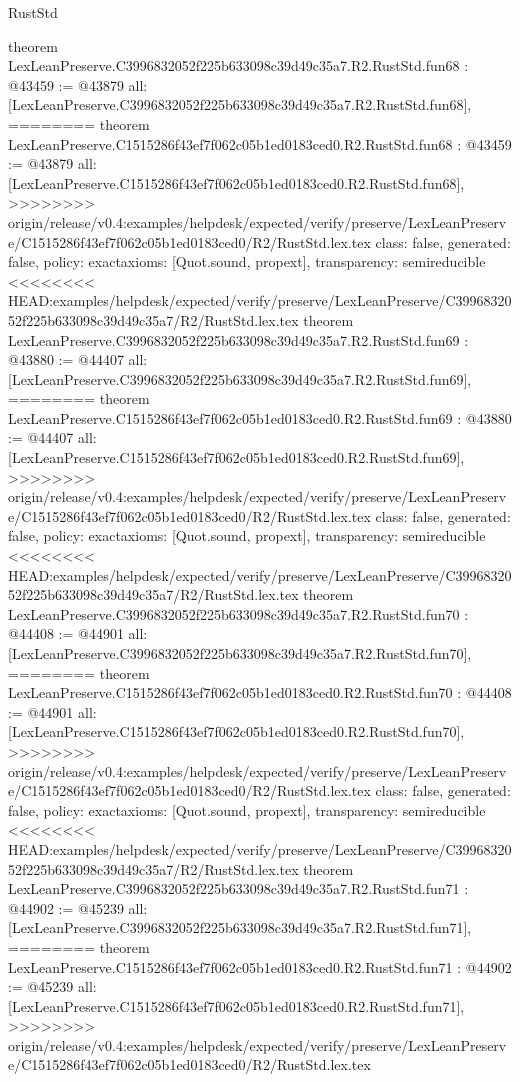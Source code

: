 \begin{lexlean}{RustStd}
\begin{coremodule}
{\begin{coremodule}
{{{{{{{{{{{{{{{{{{{{{{{{{{{{{{{{{{{{{{{{{{{{{{{{{{{{{{{{{{{{{{{{{{{{{{theorem LexLeanPreserve.C3996832052f225b633098c39d49c35a7.R2.RustStd.fun68 : @43459 := @43879 {
  all: [LexLeanPreserve.C3996832052f225b633098c39d49c35a7.R2.RustStd.fun68],
========
theorem LexLeanPreserve.C1515286f43ef7f062c05b1ed0183ced0.R2.RustStd.fun68 : @43459 := @43879 {
  all: [LexLeanPreserve.C1515286f43ef7f062c05b1ed0183ced0.R2.RustStd.fun68],
>>>>>>>> origin/release/v0.4:examples/helpdesk/expected/verify/preserve/LexLeanPreserve/C1515286f43ef7f062c05b1ed0183ced0/R2/RustStd.lex.tex
  class: false,
  generated: false,
  policy: exact{axioms: [Quot.sound, propext]},
  transparency: semireducible
}
<<<<<<<< HEAD:examples/helpdesk/expected/verify/preserve/LexLeanPreserve/C3996832052f225b633098c39d49c35a7/R2/RustStd.lex.tex
theorem LexLeanPreserve.C3996832052f225b633098c39d49c35a7.R2.RustStd.fun69 : @43880 := @44407 {
  all: [LexLeanPreserve.C3996832052f225b633098c39d49c35a7.R2.RustStd.fun69],
========
theorem LexLeanPreserve.C1515286f43ef7f062c05b1ed0183ced0.R2.RustStd.fun69 : @43880 := @44407 {
  all: [LexLeanPreserve.C1515286f43ef7f062c05b1ed0183ced0.R2.RustStd.fun69],
>>>>>>>> origin/release/v0.4:examples/helpdesk/expected/verify/preserve/LexLeanPreserve/C1515286f43ef7f062c05b1ed0183ced0/R2/RustStd.lex.tex
  class: false,
  generated: false,
  policy: exact{axioms: [Quot.sound, propext]},
  transparency: semireducible
}
<<<<<<<< HEAD:examples/helpdesk/expected/verify/preserve/LexLeanPreserve/C3996832052f225b633098c39d49c35a7/R2/RustStd.lex.tex
theorem LexLeanPreserve.C3996832052f225b633098c39d49c35a7.R2.RustStd.fun70 : @44408 := @44901 {
  all: [LexLeanPreserve.C3996832052f225b633098c39d49c35a7.R2.RustStd.fun70],
========
theorem LexLeanPreserve.C1515286f43ef7f062c05b1ed0183ced0.R2.RustStd.fun70 : @44408 := @44901 {
  all: [LexLeanPreserve.C1515286f43ef7f062c05b1ed0183ced0.R2.RustStd.fun70],
>>>>>>>> origin/release/v0.4:examples/helpdesk/expected/verify/preserve/LexLeanPreserve/C1515286f43ef7f062c05b1ed0183ced0/R2/RustStd.lex.tex
  class: false,
  generated: false,
  policy: exact{axioms: [Quot.sound, propext]},
  transparency: semireducible
}
<<<<<<<< HEAD:examples/helpdesk/expected/verify/preserve/LexLeanPreserve/C3996832052f225b633098c39d49c35a7/R2/RustStd.lex.tex
theorem LexLeanPreserve.C3996832052f225b633098c39d49c35a7.R2.RustStd.fun71 : @44902 := @45239 {
  all: [LexLeanPreserve.C3996832052f225b633098c39d49c35a7.R2.RustStd.fun71],
========
theorem LexLeanPreserve.C1515286f43ef7f062c05b1ed0183ced0.R2.RustStd.fun71 : @44902 := @45239 {
  all: [LexLeanPreserve.C1515286f43ef7f062c05b1ed0183ced0.R2.RustStd.fun71],
>>>>>>>> origin/release/v0.4:examples/helpdesk/expected/verify/preserve/LexLeanPreserve/C1515286f43ef7f062c05b1ed0183ced0/R2/RustStd.lex.tex
}}}}}}}}}}}}}}}}}}}}}}}}}}}}}}}}}}}}}}}}}}}}}}}}}}}}}}}}}}}}}}}}}}}}}}}}}}}
\end{coremodule}}
\end{coremodule}
\end{lexlean}
